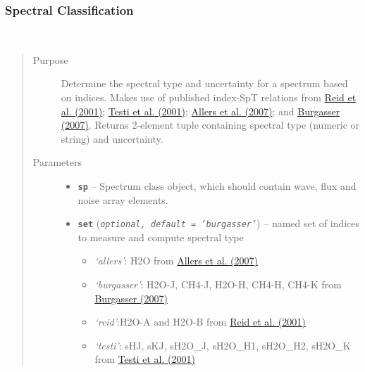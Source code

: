 \documentclass[letterpaper,10pt,english]{sphinxmanual}
\begin{document}
\subsubsection{Spectral Classification}
\label{api:spectral-classification}

\begin{fulllineitems}
\label{api:splat.classifyByIndex}~\begin{quote}\begin{description}
\item[{Purpose}] \leavevmode
Determine the spectral type and uncertainty for a spectrum
based on indices. Makes use of published index-SpT relations
from \href{http://adsabs.harvard.edu/abs/2001AJ....121.1710R}{Reid et al. (2001)};
\href{http://adsabs.harvard.edu/abs/2001ApJ...552L.147T}{Testi et al. (2001)};
\href{http://adsabs.harvard.edu/abs/2007ApJ...657..511A}{Allers et al. (2007)};
and \href{http://adsabs.harvard.edu/abs/2007ApJ...659..655B}{Burgasser (2007)}. Returns 2-element tuple
containing spectral type (numeric or string) and
uncertainty.

\item[{Parameters}] \leavevmode\begin{itemize}
\item {} 
\textbf{\texttt{sp}} -- Spectrum class object, which should contain wave, flux and
noise array elements.

\item {} 
\textbf{\texttt{set}} (\emph{\texttt{optional, default = 'burgasser'}}) -- 
named set of indices to measure and compute spectral type
\begin{itemize}
\item {} 
\emph{`allers'}: H2O from \href{http://adsabs.harvard.edu/abs/2007ApJ...657..511A}{Allers et al. (2007)}

\item {} 
\emph{`burgasser'}: H2O-J, CH4-J, H2O-H, CH4-H, CH4-K from \href{http://adsabs.harvard.edu/abs/2007ApJ...659..655B}{Burgasser (2007)}

\item {} 
\emph{`reid'}:H2O-A and H2O-B from \href{http://adsabs.harvard.edu/abs/2001AJ....121.1710R}{Reid et al. (2001)}

\item {} 
\emph{`testi'}: sHJ, sKJ, sH2O\_J, sH2O\_H1, sH2O\_H2, sH2O\_K from \href{http://adsabs.harvard.edu/abs/2001ApJ...552L.147T}{Testi et al. (2001)}


\end{itemize}
\end{itemize}
\end{description}
\end{quote}
\end{fulllineitems}
\end{document}
